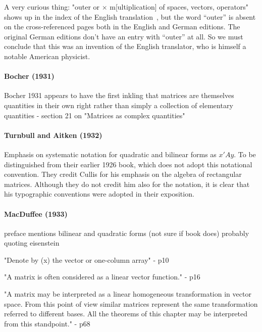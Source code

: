 A very curious thing: "outer or $\times$ m[ultiplication] of spaces, vectors, operators" shows up in the index of the English translation~\cite{Weyl1931}, but the word ``outer'' is absent on the cross-referenced pages both in the English and German editions. The original German editions don't have an entry with ``outer'' at all. So we must conclude that this was an invention of the English translator, who is himself a notable American physicist.



\paragraph{Bocher (1931)}

Bocher 1931 appears to have the first inkling that matrices are themselves quantities in their own right rather than simply a collection of elementary quantities - section 21 on "Matrices as complex quantities"




\paragraph{Turnbull and Aitken (1932)}

Emphasis on systematic notation for quadratic and bilinear forms as $x'Ay$.
To be distinguished from their earlier 1926 book, which does not adopt this notational convention.
They credit Cullis for his emphasis on the algebra of rectangular matrices. Although they do not credit him also for the notation, it is clear that his typographic conventions were adopted in their exposition.



\paragraph{MacDuffee (1933)~\cite{MacDuffee1933}}

preface mentions bilinear and quadratic forms (not sure if book does)
probably quoting eisenstein

"Denote by (x) the vector or one-column array" - p10

"A matrix is often considered as a linear vector function." - p16

"A matrix may be interpreted as a linear homogeneous transformation in
vector space. From this point of view similar matrices represent the
same transformation referred to different bases. All the theorems of
this chapter may be interpreted from this standpoint." - p68

